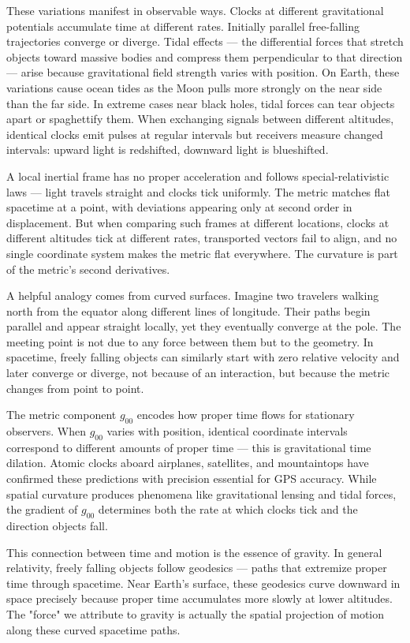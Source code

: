 These variations manifest in observable ways. Clocks at different gravitational potentials accumulate time at different rates. Initially parallel free-falling trajectories converge or diverge. Tidal effects — the differential forces that stretch objects toward massive bodies and compress them perpendicular to that direction — arise because gravitational field strength varies with position. On Earth, these variations cause ocean tides as the Moon pulls more strongly on the near side than the far side. In extreme cases near black holes, tidal forces can tear objects apart or spaghettify them. When exchanging signals between different altitudes, identical clocks emit pulses at regular intervals but receivers measure changed intervals: upward light is redshifted, downward light is blueshifted.

A local inertial frame has no proper acceleration and follows special-relativistic laws — light travels straight and clocks tick uniformly. The metric matches flat spacetime at a point, with deviations appearing only at second order in displacement. But when comparing such frames at different locations, clocks at different altitudes tick at different rates, transported vectors fail to align, and no single coordinate system makes the metric flat everywhere. The curvature is part of the metric's second derivatives.

A helpful analogy comes from curved surfaces. Imagine two travelers walking north from the equator along different lines of longitude. Their paths begin parallel and appear straight locally, yet they eventually converge at the pole. The meeting point is not due to any force between them but to the geometry. In spacetime, freely falling objects can similarly start with zero relative velocity and later converge or diverge, not because of an interaction, but because the metric changes from point to point.

The metric component \( g_{00} \) encodes how proper time flows for stationary observers. When \( g_{00} \) varies with position, identical coordinate intervals correspond to different amounts of proper time — this is gravitational time dilation. Atomic clocks aboard airplanes, satellites, and mountaintops have confirmed these predictions with precision essential for GPS accuracy. While spatial curvature produces phenomena like gravitational lensing and tidal forces, the gradient of \( g_{00} \) determines both the rate at which clocks tick and the direction objects fall.

This connection between time and motion is the essence of gravity. In general relativity, freely falling objects follow geodesics — paths that extremize proper time through spacetime. Near Earth's surface, these geodesics curve downward in space precisely because proper time accumulates more slowly at lower altitudes. The "force" we attribute to gravity is actually the spatial projection of motion along these curved spacetime paths.


